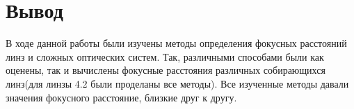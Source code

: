 \documentclass[a4paper,12pt]{article}
\begin{document}
\section{Вывод}
В ходе данной работы были изучены методы определения фокусных расстояний линз и сложных оптических систем. Так, различными способами были как оценены, так и вычислены фокусные расстояния различных собирающихся линз(для линзы 4.2 были проделаны все методы). Все изученные методы давали значения фокусного расстояние, близкие друг к другу.
\end{document}
